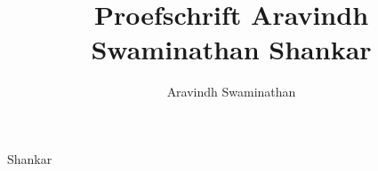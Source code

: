 \documentclass[print]{dissertation}
\begin{document}
		\sloppy
		
		\title[]{Proefschrift Aravindh Swaminathan Shankar} %
		\author{Aravindh Swaminathan}{Shankar}
		
		\frontmatter
		
		 
		
		
		
		
		\setlength{\parindent}{0pt}
		\setlength{\parskip}{1em}
		
		\mainmatter
		
		
		\thumbtrue
		
		
	
		
		\thumbfalse
		
		  
		  
		
		
		
	
\end{document}
